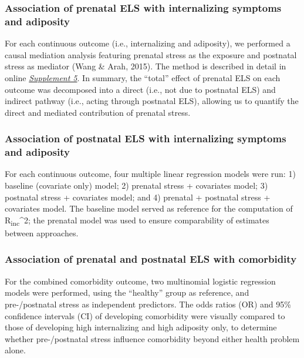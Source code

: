\documentclass[
  letterpaper,
  DIV=11,
  numbers=noendperiod]{scrreport}
\begin{document}
\subsubsection{Association of prenatal ELS with internalizing symptoms
and
adiposity}\label{association-of-prenatal-els-with-internalizing-symptoms-and-adiposity}

For each continuous outcome (i.e., internalizing and adiposity), we
performed a causal mediation analysis featuring prenatal stress as the
exposure and postnatal stress as mediator (Wang \& Arah, 2015). The
method is described in detail in online
\href{https://osf.io/xs29c}{\emph{Supplement 5}}. In summary, the
``total'' effect of prenatal ELS on each outcome was decomposed into a
direct (i.e., not due to postnatal ELS) and indirect pathway (i.e.,
acting through postnatal ELS), allowing us to quantify the direct and
mediated contribution of prenatal stress.

\subsubsection{Association of postnatal ELS with internalizing symptoms
and
adiposity}\label{association-of-postnatal-els-with-internalizing-symptoms-and-adiposity}

For each continuous outcome, four multiple linear regression models were
run: 1) baseline (covariate only) model; 2) prenatal stress + covariates
model; 3) postnatal stress + covariates model; and 4) prenatal +
postnatal stress + covariates model. The baseline model served as
reference for the computation of R\textsubscript{inc}\^{}2; the prenatal
model was used to ensure comparability of estimates between approaches.

\subsubsection{Association of prenatal and postnatal ELS with
comorbidity}\label{association-of-prenatal-and-postnatal-els-with-comorbidity}

For the combined comorbidity outcome, two multinomial logistic
regression models were performed, using the ``healthy'' group as
reference, and pre-/postnatal stress as independent predictors. The odds
ratios (OR) and 95\% confidence intervals (CI) of developing comorbidity
were visually compared to those of developing high internalizing and
high adiposity only, to determine whether pre-/postnatal stress
influence comorbidity beyond either health problem alone.
\end{document}
